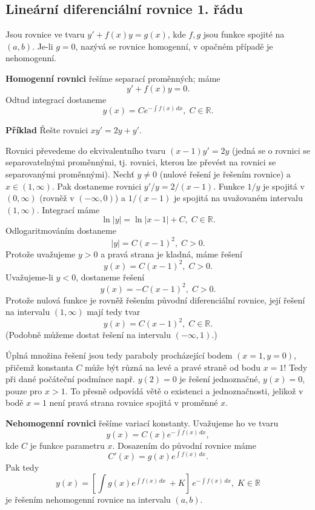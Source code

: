 \documentclass[a4paper,10pt]{book}
\begin{document}
\subsection{Lineární diferenciální rovnice 1. řádu}
   Jsou rovnice ve tvaru $y'+f(x)y=g(x)$, kde $f,g$ jsou funkce spojité na $(a,b)$.
   Je-li $g=0$, nazývá se rovnice homogenní, v opačném případě je nehomogenní.
   
   {\bf Homogenní rovnici} řešíme separací proměnných; máme
   \[
      y'+f(x)y = 0.
   \]
   Odtud integrací dostaneme
   \[
      y(x) = Ce^{-\int f(x)\,dx}, \; C\in\mathbb{R}.
   \]

   {\bf Příklad}
   Řešte rovnici $xy'=2y+y'$.

   Rovnici převedeme do ekvivalentního tvaru $(x-1)y'=2y$ (jedná se o rovnici se separovatelnými proměnnými,
   tj. rovnici, kterou lze převést na rovnici se separovanými proměnnými).
   Nechť $y\neq 0$ (nulové řešení je řešením rovnice) a $x\in(1,\infty)$.
   Pak dostaneme rovnici $y'/y=2/(x-1)$. Funkce $1/y$ je spojitá v $(0,\infty)$ (rovněž v $(-\infty,0)$)
   a $1/(x-1)$ je spojitá na uvažovaném intervalu $(1,\infty)$.
   Integrací máme
   \[
      \ln|y| = \ln|x-1|+C, \; C\in\mathbb{R}.
   \]
   Odlogaritmováním dostaneme
   \[
      |y| = C(x-1)^2, \; C>0.
   \]
   Protože uvažujeme $y>0$ a pravá strana je kladná, máme řešení
   \[
      y(x) = C(x-1)^2, \; C>0.
   \] 
   Uvažujeme-li $y<0$, dostaneme řešení
   \[
      y(x) = -C(x-1)^2, \;C>0.
   \]
   Protože nulová funkce je rovněž řešením původní diferenciální rovnice,
   její řešení na intervalu $(1,\infty)$ mají tedy tvar
   \[
      y(x) = C(x-1)^2, \; C\in\mathbb{R}.
   \]
   (Podobně můžeme dostat řešení na intervalu $(-\infty,1)$.)

   Úplná množina řešení jsou tedy paraboly procházející bodem $(x=1,y=0)$, přičemž konstanta $C$ může být
   různá na levé a pravé straně od bodu $x=1$! Tedy při dané počáteční podmínce např. $y(2) = 0$ je řešení
   jednoznačné, $y(x)=0$, pouze pro $x>1$. To přesně odpovídá větě o existenci a jednoznačnosti, jelikož v bodě
   $x=1$ není pravá strana rovnice spojitá v proměnné $x$.

   {\bf Nehomogenní rovnici} řešíme variací konstanty. Uvažujeme ho ve tvaru
   \[
      y(x) = C(x)e^{-\int f(x)\,dx},
   \]
   kde $C$ je funkce parametru $x$.
   Dosazením do původní rovnice máme
   \[
      C'(x) = g(x)e^{\int f(x)\,dx}.
   \]
   Pak tedy
   \[
      y(x)=\left[\int g(x)e^{\int f(x)\,dx}\,+K\right]\,e^{-\int f(x)\,dx}, \;K\in\mathbb{R}
   \]
   je řešením nehomogenní rovnice na intervalu $(a,b)$.
\end{document}
